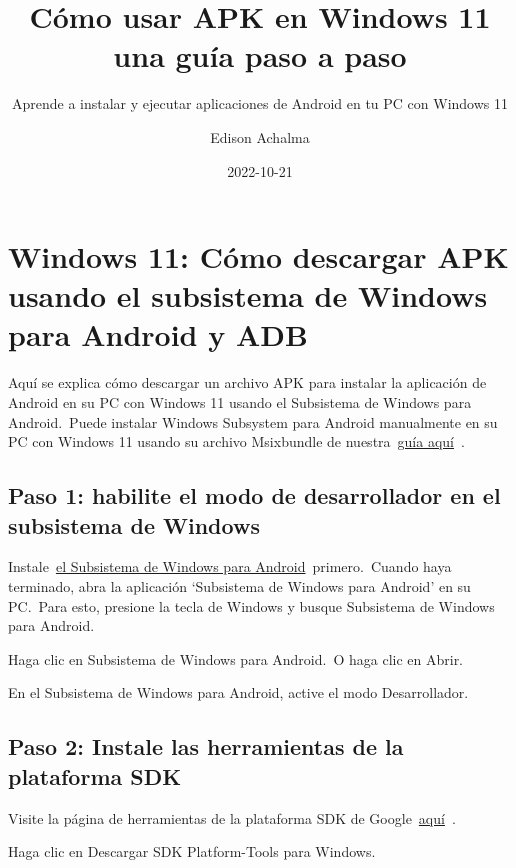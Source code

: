 \documentclass[
  a4paper,
]{article}
\title{Cómo usar APK en Windows 11 una guía paso a paso}
\subtitle{Aprende a instalar y ejecutar aplicaciones de Android en tu PC
con Windows 11}
\author{Edison Achalma}
\date{2022-10-21}
\begin{document}
\maketitle

\section{Windows 11: Cómo descargar APK usando el subsistema de Windows
para Android y
ADB}\label{windows-11-cuxf3mo-descargar-apk-usando-el-subsistema-de-windows-para-android-y-adb}

Aquí se explica cómo descargar un archivo APK para instalar la
aplicación de Android en su PC con Windows 11 usando el Subsistema de
Windows para Android.~Puede instalar Windows Subsystem para Android
manualmente en su PC con Windows 11 usando su archivo Msixbundle de
nuestra~\href{https://nerdschalk.com/android-apps-on-windows-11-dev-channel-how-to-install-windows-subsystem-for-android-manually-with-msixbundle/}{guía
aquí}~.

\subsection{Paso 1: habilite el modo de desarrollador en el subsistema
de
Windows}\label{paso-1-habilite-el-modo-de-desarrollador-en-el-subsistema-de-windows}

Instale~\href{https://nerdschalk.com/android-apps-on-windows-11-dev-channel-how-to-install-windows-subsystem-for-android-manually-with-msixbundle/}{el
Subsistema de Windows para Android}~primero.~Cuando haya terminado, abra
la aplicación `Subsistema de Windows para Android' en su PC.~Para esto,
presione la tecla de Windows y busque Subsistema de Windows para
Android.

Haga clic en Subsistema de Windows para Android.~O haga clic en Abrir.

En el Subsistema de Windows para Android, active el modo Desarrollador.

\subsection{Paso 2: Instale las herramientas de la plataforma
SDK}\label{paso-2-instale-las-herramientas-de-la-plataforma-sdk}

Visite la página de herramientas de la plataforma SDK de
Google~\href{https://developer.android.com/studio/releases/platform-tools.html}{aquí}~.

Haga clic en Descargar SDK Platform-Tools para Windows.
\end{document}

